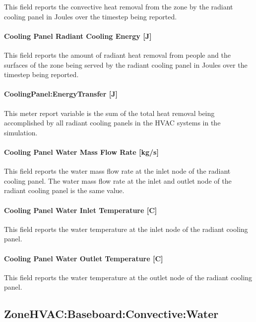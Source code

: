 This field reports the convective heat removal from the zone by the radiant cooling panel in Joules over the timestep being reported.

\paragraph{Cooling Panel Radiant Cooling Energy [J]}\label{cooling-panel-radiant-cooling-energy-j}

This field reports the amount of radiant heat removal from people and the surfaces of the zone being served by the radiant cooling panel in Joules over the timestep being reported.

\paragraph{CoolingPanel:EnergyTransfer [J]}\label{coolingpanel-energytransfer-j}

This meter report variable is the sum of the total heat removal being accomplished by all radiant cooling panels in the HVAC systems in the simulation.

\paragraph{Cooling Panel Water Mass Flow Rate [kg/s]}\label{cooling-panel-water-mass-flow-rate-kgs}

This field reports the water mass flow rate at the inlet node of the radiant cooling panel.  The water mass flow rate at the inlet and outlet node of the radiant cooling panel is the same value.

\paragraph{Cooling Panel Water Inlet Temperature [C]}\label{cooling-panel-water-inlet-temperature-c}

This field reports the water temperature at the inlet node of the radiant cooling panel.

\paragraph{Cooling Panel Water Outlet Temperature [C]}\label{cooling-panel-water-outlet-temperature-c}

This field reports the water temperature at the outlet node of the radiant cooling panel.

\subsection{ZoneHVAC:Baseboard:Convective:Water}\label{zonehvacbaseboardconvectivewater}

